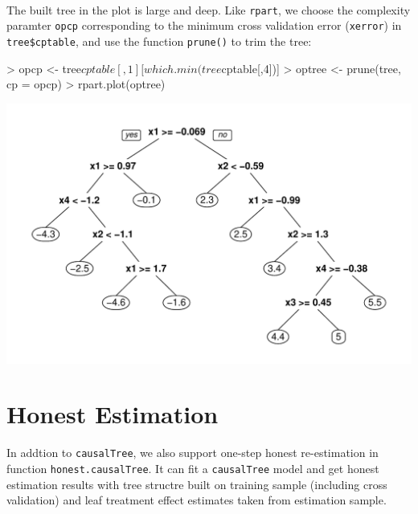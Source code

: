 \documentclass[11pt]{article}
\renewenvironment{Schunk}{\vspace{\topsep}}{\vspace{\topsep}}
\begin{document}
\\
The built tree in the plot is large and deep. Like \texttt{rpart}, we choose the complexity paramter \texttt{opcp} corresponding to the minimum cross validation error (\texttt{xerror}) in \texttt{tree\$cptable}, and use the function \texttt{prune()} to trim the tree: 
\begin{Schunk}
\begin{Sinput}
> opcp <- tree$cptable[, 1][which.min(tree$cptable[,4])]
> optree <- prune(tree, cp = opcp)
> rpart.plot(optree)
\end{Sinput}
\end{Schunk}
\includegraphics{briefintro-prune}
\section{Honest Estimation}
In addtion to \texttt{causalTree}, we also support one-step honest re-estimation in function \texttt{honest.causalTree}. It can fit a \texttt{causalTree} model and get honest estimation results with tree structre built on training sample (including cross validation) and leaf treatment effect estimates taken from estimation sample.
\end{document}
